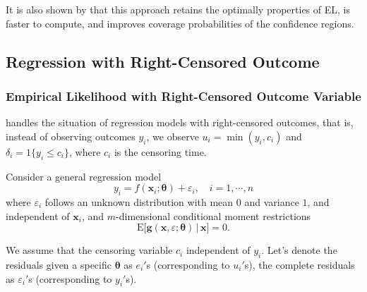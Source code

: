 \documentclass[article]{jss}
\newcommand{\xx}{\bm x}
\newcommand{\tth}{\bm \theta}
\renewcommand{\gg}{\bm g}
\renewcommand{\E}{\textrm{E}}
\newcommand{\e}{\varepsilon}
\renewcommand{\|}{\,|\,}
\begin{document}
It is also shown by \citet{chen-et-al2008} that this approach retains the optimally properties of EL, is faster to compute, and improves coverage probabilities of the confidence regions.

\hypertarget{regression-with-right-censored-outcome}{%
\subsection{Regression with Right-Censored Outcome}\label{regression-with-right-censored-outcome}}

\hypertarget{empirical-likelihood-with-right-censored-outcome-variable}{%
\subsubsection{Empirical Likelihood with Right-Censored Outcome Variable}\label{empirical-likelihood-with-right-censored-outcome-variable}}

 handles the situation of regression models with right-censored outcomes, that is, instead of observing outcomes \(y_i\), we observe \(u_i = \min(y_i, c_i)\) and \(\delta_i = \mathfrak 1\{y_i \le c_i\}\), where \(c_i\) is the censoring time.

Consider a general regression model
\[
  y_i = f(\xx_i; \tth) + \e_i, \quad i=1,\cdots,n
\]
where \(\e_i\) follows an unknown distribution with mean \(0\) and variance \(1\), and independent of \(\xx_i\), and \(m\)-dimensional conditional moment restrictions
\begin{equation}\label{eq:cmom}
  \E\bigl[\gg(\xx, \e; \tth) \| \xx\bigr] = 0.
\end{equation}

We assume that the censoring variable \(c_i\) independent of \(y_i\). Let's denote the residuals given a specific \(\tth\) as \(e_i'\)s (corresponding to \(u_i'\)s), the complete residuals as \(\e_i'\)s (corresponding to \(y_i'\)s).
\end{document}
